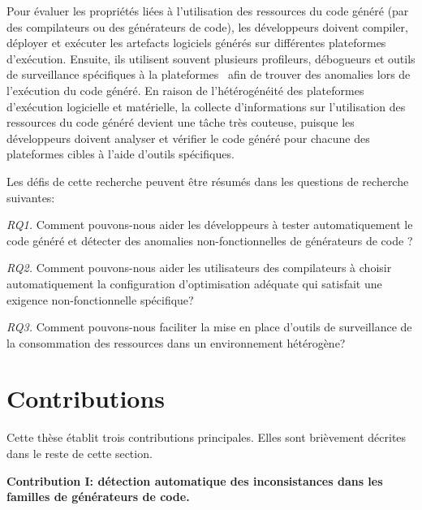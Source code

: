 Pour \'evaluer les propri\'et\'es li\'ees \`a l'utilisation des ressources du code g\'en\'er\'e (par des compilateurs ou des g\'en\'erateurs de code), les d\'eveloppeurs doivent compiler, d\'eployer et ex\'ecuter les artefacts logiciels g\'en\'er\'es sur diff\'erentes plateformes d'ex\'ecution. Ensuite, ils utilisent souvent plusieurs profileurs, d\'ebogueurs et outils de surveillance sp\'ecifiques \`a la plateformes~\cite{guana2014chaintracker, delgado2004taxonomy} afin de trouver des anomalies lors de l'ex\'ecution du code g\'en\'er\'e. En raison de l'h\'et\'erog\'en\'eit\'e des plateformes d'ex\'ecution logicielle et mat\'erielle, la collecte d'informations sur l'utilisation des ressources du code g\'en\'er\'e devient une t\^ache tr\`es couteuse, puisque les d\'eveloppeurs doivent analyser et v\'erifier le code g\'en\'er\'e pour chacune des plateformes cibles \`a l'aide d'outils sp\'ecifiques.




Les d\'efis de cette recherche peuvent \^etre r\'esum\'es dans les questions de recherche suivantes:

\textit{RQ1.} Comment pouvons-nous aider les d\'eveloppeurs \`a tester automatiquement le code g\'en\'er\'e et d\'etecter des anomalies non-fonctionnelles de g\'en\'erateurs de code ? 

\textit{RQ2.} Comment pouvons-nous aider les utilisateurs des compilateurs \`a choisir automatiquement la configuration d'optimisation ad\'equate qui satisfait une exigence non-fonctionnelle sp\'ecifique? 

\textit{RQ3.} Comment pouvons-nous faciliter la mise en place d'outils de surveillance de la consommation des ressources dans un environnement h\'et\'erog\`ene?


\section*{Contributions}
Cette th\`ese \'etablit trois contributions principales. Elles sont bri\`evement d\'ecrites dans le reste de cette section.  

\textbf{Contribution I: d\'etection automatique des inconsistances dans les familles de g\'en\'erateurs de code.} 

